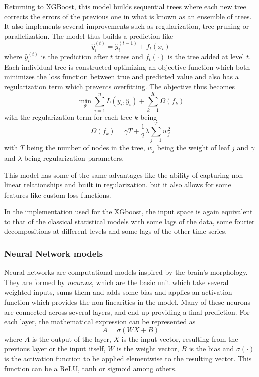 \begin{itemize}
    Returning to XGBoost, this model builds sequential trees where each new tree corrects the errors of the previous one in what is known as an ensemble of trees. It also implements several improvements such as regularization, tree pruning or parallelization. The model thus builds a prediction like
    \begin{equation}
        \hat{y}_i^{(t)} = \hat{y}_i^{(t-1)} + f_t(x_i)
    \end{equation}
    where $\hat{y}_i^{(t)}$ is the prediction after $t$ trees and $f_t(\cdot)$ is the tree added at level $t$. Each individual tree is constructed optimizing an objective function which both minimizes the loss function between true and predicted value and also has a regularization term which prevents overfitting. The objective thus becomes
    \begin{equation}
        \min_\theta \sum_{i=1}^n L(y_i,\hat{y}_i) + \sum_{k=1}^K \Omega(f_k)
    \end{equation}
    with the regularization term for each tree $k$ being 
    \begin{equation}
        \Omega(f_k)=\gamma T + \frac{1}{2}\lambda\sum_{j=1}^{T}w_j^2
    \end{equation}
    with $T$ being the number of nodes in the tree, $w_j$ being the weight of leaf $j$ and $\gamma$ and $\lambda$ being regularization parameters.

    This model has some of the same advantages like the ability of capturing non linear relationships and built in regularization, but it also allows for some features like custom loss functions.
    
    In the implementation used for the XGboost, the input space is again equivalent to that of the classical statistical models with some lags of the data, some fourier decompositions at different levels and some lags of the other time series. 
\end{itemize}

\subsubsection{Neural Network models}
Neural networks are computational models inspired by the brain's morphology. They are formed by \textit{neurons}, which are the basic unit which take several weighted inputs, sums them and adds some bias and applies an activation function which provides the non linearities in the model. Many of these neurons are connected across several layers, and end up providing a final prediction. For each layer, the mathematical expression can be represented as
\begin{equation}
    A=\sigma\left(WX+B\right)
\end{equation}
where $A$ is the output of the layer, $X$ is the input vector, resulting from the previous layer or the input itself, $W$ is the weight vector, $B$ is the bias and $\sigma(\cdot)$ is the activation function to be applied elementwise to the resulting vector. This function can be a ReLU, tanh or sigmoid among others. 

